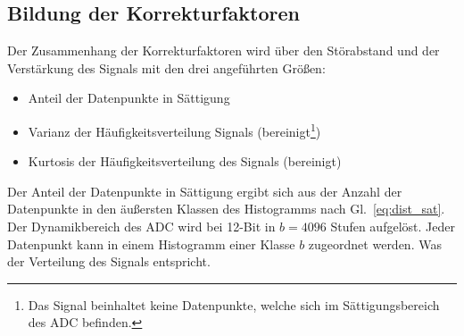 %
 
\subsection{Bildung der Korrekturfaktoren}
Der Zusammenhang der Korrekturfaktoren wird über den Störabstand und der Verstärkung des Signals mit den drei angeführten Größen: 

\begin{itemize}
	\item Anteil der Datenpunkte in Sättigung %
	\item Varianz der Häufigkeitsverteilung Signals (bereinigt\footnote[1]{Das Signal beinhaltet keine Datenpunkte, welche sich im Sättigungsbereich des ADC befinden.\label{foot:bereinigt}})
	\item Kurtosis der Häufigkeitsverteilung des Signals (bereinigt)
	\end{itemize}


Der Anteil der Datenpunkte in Sättigung ergibt sich aus der Anzahl der Datenpunkte in den äußersten Klassen des Histogramms nach Gl.~\eqref{eq:dist_sat}. Der Dynamikbereich des ADC wird bei 12-Bit in $b=4096$ Stufen aufgelöst. Jeder Datenpunkt kann in einem Histogramm einer Klasse $b$ zugeordnet werden. Was der Verteilung des Signals entspricht. 

